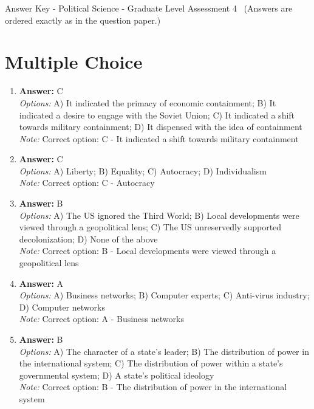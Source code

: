 \documentclass[12pt]{article}
\begin{document}
\begin{center}
Answer Key - Political Science - Graduate Level Assessment 4 \
\small (Answers are ordered exactly as in the question paper.)
\end{center}

\section*{Multiple Choice}
\begin{enumerate}[label=\arabic*.]
\item \textbf{Answer:} C
\\ \textit{Options:} A) It indicated the primacy of economic containment; B) It indicated a desire to engage with the Soviet Union; C) It indicated a shift towards military containment; D) It dispensed with the idea of containment
\\ \textit{Note:} Correct option: C - It indicated a shift towards military containment
\item \textbf{Answer:} C
\\ \textit{Options:} A) Liberty; B) Equality; C) Autocracy; D) Individualism
\\ \textit{Note:} Correct option: C - Autocracy
\item \textbf{Answer:} B
\\ \textit{Options:} A) The US ignored the Third World; B) Local developments were viewed through a geopolitical lens; C) The US unreservedly supported decolonization; D) None of the above
\\ \textit{Note:} Correct option: B - Local developments were viewed through a geopolitical lens
\item \textbf{Answer:} A
\\ \textit{Options:} A) Business networks; B) Computer experts; C) Anti-virus industry; D) Computer networks
\\ \textit{Note:} Correct option: A - Business networks
\item \textbf{Answer:} B
\\ \textit{Options:} A) The character of a state's leader; B) The distribution of power in the international system; C) The distribution of power within a state's governmental system; D) A state's political ideology
\\ \textit{Note:} Correct option: B - The distribution of power in the international system
\end{enumerate}
\end{document}
